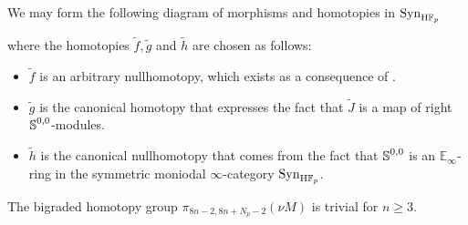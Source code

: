\begin{cnstr}\label{cnstr:synth-toda-diagram}
  We may form the following diagram of morphisms and homotopies in $\mathrm{Syn}_{\mathrm{H}\mathbb{F}_p}$
\begin{center}
\end{center}
where the homotopies $\tilde{f},\tilde{g}$ and $\tilde{h}$ are chosen as follows:
\begin{itemize}
\item $\tilde{f}$ is an arbitrary nullhomotopy, which exists as a consequence of .
\item $\tilde{g}$ is the canonical homotopy that expresses the fact that $\tilde{J}$ is a map of right $\operatorname{\mathbb{S}}^{0,0}$-modules.
\item $\tilde{h}$ is the canonical nullhomotopy that comes from the fact that $\operatorname{\mathbb{S}}^{0,0}$ is an $\mathbb{E}_\infty$-ring in the symmetric moniodal $\infty$-category $\mathrm{Syn}_{\mathrm{H}\mathbb{F}_p}$.
\end{itemize}

\end{cnstr}

\begin{prop}\label{thm:vanishinggroup}
    The bigraded homotopy group $\pi_{8n-2,8n+N_p-2}(\nu M )$ is trivial for $n \geq 3$.
\end{prop}

